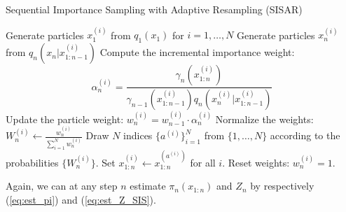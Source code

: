 \begin{algorithm}[H]
	\caption{Sequential Importance Sampling with Adaptive Resampling (SISAR)}
	\label{algo:SISAR}
	\begin{algorithmic}[1]
		\State Generate particles \(x_1^{(i)}\) from \( q_1(x_1)\) for \( i = 1, \dots, N \)
		\State Generate particles \(x_n^{(i)}\) from \(q_n(x_n\vert x_{1:n-1}^{(i)})\) 
		\State Compute the incremental importance weight: 
		\[
		\alpha_n^{(i)} = \frac{\gamma_n(x_{1:n}^{(i)})}{\gamma_{n-1}(x_{1:n-1}^{(i)}) q_n(x_n^{(i)} \vert x_{1:n-1}^{(i)})} 
		\] 
		\State Update the particle weight: \( w_n^{(i)} = w_{n-1}^{(i)} \cdot \alpha_n^{(i)} \)
		\EndFor
		\State Normalize the weights: \(W_n^{(i)} \leftarrow \frac{w_n^{(i)}}{\sum_{i=1}^N w_n^{(i)}} \)
		\State Draw \(N\) indices \(\{a^{(i)}\}_{i=1}^N\) from \(\{1,\dots,N\}\) according to the probabilities \(\{W_n^{(i)}\}\).
		\State Set \( x_{1:n}^{(i)} \leftarrow x_{1:n}^{(a^{(i)})} \) for all \( i \).
		\State Reset weights: $w_n^{(i)}=1$.
		\EndIf
		\EndFor
	\end{algorithmic}
\end{algorithm}
\noindent Again, we can at any step $n$ estimate $\pi_n(x_{1:n})$ and $Z_n$ by respectively (\ref{eq:est_pi}) and (\ref{eq:est_Z_SIS}).

\begin{example}
	\label{exa:weight degeneracy}
	\begin{comment}
		We resort to estimating the variance using Monte Carlo in this example. We implement the SIS, SISR, and SISAR algorithms in R. To avoid overflow we define
		\[
		\widetilde{Z}_n=\frac{\widehat{Z}_n}{Z_n},
		\]
		and we then estimate the variance of $\widetilde{Z}_n$ using Monte Carlo, since
		\[
		\Var(\widetilde{Z}_n)=\Var\Bigl(\frac{\widehat{Z}_n}{Z_n}\Bigr)=\frac{\Var(\widetilde{Z}_n)}{Z_n^2}.
		\]
		The code can be found at \todo{Insert GitHub link for code }
	\end{comment}
\end{example}